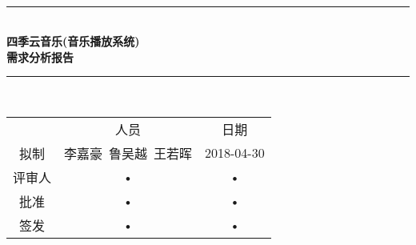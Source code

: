 \documentclass[bachelor]{ustcthesis}
\newcommand{\proname}{四季云音乐}
\newcommand{\docname}{\proname (音乐播放系统)}
\newcommand{\HRule}{\rule{\linewidth}{0.5mm}}
\begin{document}
\begin{titlepage}
\begin{center}
~\\[5cm]
\HRule \\[0.4cm]
{\huge \bfseries \docname\\需求分析报告}\\[0.4cm]
\HRule \\[1.5cm]

\begin{tabular}{ccc}
  & 人员 & 日期 \\ 
拟制   & 李嘉豪\ 鲁吴越\ 王若晖 & 2018-04-30 \\ 
评审人 & • & • \\ 
批准   & • & • \\ 
签发   & • & • \\ 
\end{tabular} 

\end{center}
\end{titlepage}



\frontmatter

\tableofcontents
\listoffigures
\listoftables
% 

\mainmatter











\appendix


\end{document}
